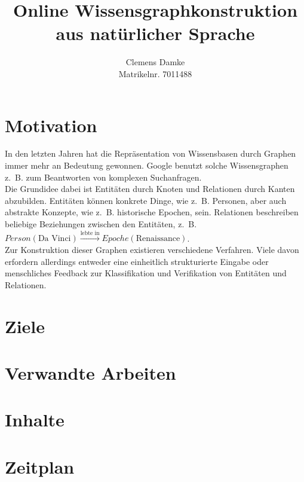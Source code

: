 \documentclass[11pt, a4paper]{scrreprt}
\begin{document}
\frontmatter
\subject{Bachelorarbeit Proposal}
\title{
	Online Wissensgraphkonstruktion\\
	aus natürlicher Sprache
	}
\author{
	Clemens Damke\\[1ex]
	Matrikelnr. 7011488
}
\publishers{
	{\normalsize betreut von}\\[2ex]
	Prof.\ Dr.\ Eyke Hüllermeier\\
	Intelligente Systeme\\
	Institut für Informatik\\
	Universität Paderborn
}
\maketitle

\section{Motivation}

In den letzten Jahren hat die Repräsentation von Wissensbasen durch Graphen immer mehr an Bedeutung gewonnen.
Google benutzt solche Wissensgraphen z.~B. zum Beantworten von komplexen Suchanfragen.\\

Die Grundidee dabei ist Entitäten durch Knoten und Relationen durch Kanten abzubilden.
Entitäten können konkrete Dinge, wie z.~B. Personen, aber auch abstrakte Konzepte, wie z.~B. historische Epochen, sein.
Relationen beschreiben beliebige Beziehungen zwischen den Entitäten, z.~B. $Person(\text{Da Vinci}) \xrightarrow{\text{lebte in}} Epoche(\text{Renaissance})$.\\

Zur Konstruktion dieser Graphen existieren verschiedene Verfahren.
Viele davon erfordern allerdings entweder eine einheitlich strukturierte Eingabe oder menschliches Feedback zur Klassifikation und Verifikation von Entitäten und Relationen.

\section{Ziele}

\section{Verwandte Arbeiten}

\section{Inhalte}

\section{Zeitplan}
\end{document}
